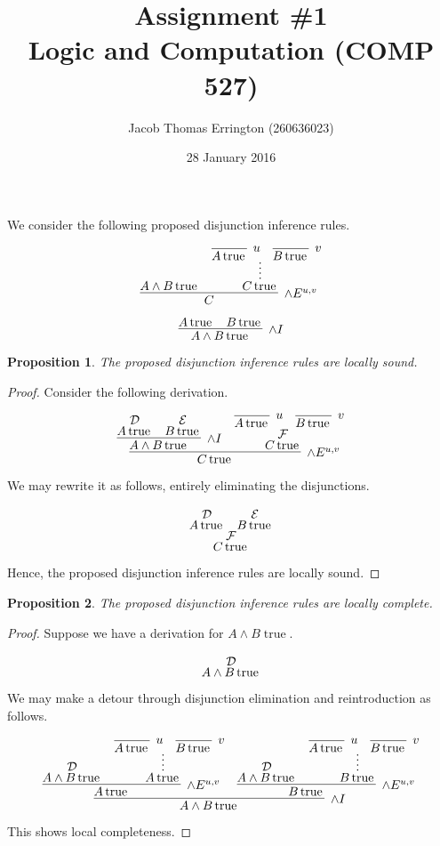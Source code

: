 \documentclass[11pt,letterpaper]{article}
\author{Jacob Thomas Errington (260636023)}
\date{28 January 2016}
\title{Assignment \#1\\Logic and Computation (COMP 527)}
\DeclareMathOperator{\TrueOp}{true}
\newcommand{\true}{\TrueOp{}}
\newtheorem{proposition}{Proposition}
\begin{document}
\maketitle

We consider the following proposed disjunction inference rules.

$$
\infer[\land E^{u, v}]{C}{
    A \land B \true
    &
    \infer*{C \true}{
        \infer[u]{A \true}{\;}
        &
        \infer[v]{B \true}{\;}
    }
}
$$

$$
\infer[\land I]{A \land B \true}{
    A \true
    &
    B \true
}
$$

\begin{proposition}
    The proposed disjunction inference rules are locally sound.
\end{proposition}

\begin{proof}
    Consider the following derivation.

    $$
    \infer[\land E^{u, v}]{C \true}{
        \infer[\land I]{A \land B \true}{
            \deduce[\mathcal{D}]{A \true}{}
            &
            \deduce[\mathcal{E}]{B \true}{}
        }
        &
        \deduce[\mathcal{F}]{C \true}{
            \infer[u]{A \true}{}
            &
            \infer[v]{B \true}{}
        }
    }
    $$

    We may rewrite it as follows, entirely eliminating the disjunctions.

    $$
    \deduce[\mathcal{F}]{C \true}{
        \deduce[\mathcal{D}]{A \true}{}
        &
        \deduce[\mathcal{E}]{B \true}{}
    }
    $$

    Hence, the proposed disjunction inference rules are locally sound.
\end{proof}

\begin{proposition}
    The proposed disjunction inference rules are locally complete.
\end{proposition}

\begin{proof}
    Suppose we have a derivation for $A \land B \true$.

    $$
    \deduce[\mathcal{D}]{A \land B \true}{}
    $$

    We may make a detour through disjunction elimination and reintroduction as
    follows.

    $$
    \infer[\land I]{A \land B \true}{
        \infer[\land E^{u, v}]{A \true}{
            \deduce[\mathcal{D}]{A \land B \true}{}
            &
            \infer*{A \true}{
                \infer[u]{A \true}{}
                &
                \infer[v]{B \true}{}
            }
        }
        &
        \infer[\land E^{u, v}]{B \true}{
            \deduce[\mathcal{D}]{A \land B \true}{}
            &
            \infer*{B \true}{
                \infer[u]{A \true}{}
                &
                \infer[v]{B \true}{}
            }
        }
    }
    $$

    This shows local completeness.
\end{proof}
\end{document}
